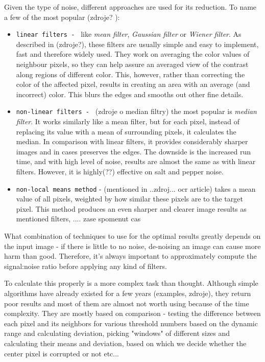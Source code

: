 Given the type of noise, different approaches are used for its reduction. To name a few of the most popular (zdroje? ):
\begin{itemize}

\item\texttt{linear filters - } like \emph{mean filter}, \emph{Gaussian filter} or \emph{Wiener filter}. As described in (zdroje?), these filters are usually simple and easy to implement, fast and therefore widely used. They work on averaging the color values of neighbour pixels, so they can help assure an averaged view of the contrast along regions of different color. This, however, rather than correcting the color of the affected pixel, results in creating an area with an average (and incorrect) color. This blurs the edges and smooths out other fine details.

\item\texttt{non-linear filters - } (zdroje o median filtry) the most popular is \emph{median filter}. It works similarly like a mean filter, but for each pixel, instead of replacing its value with a mean of surrounding pixels, it calculates the median. In comparison with linear filters, it provides considerably sharper images and in cases preserves the edges. The downside is the increased run time, and with high level of noise, results are almost the same as with linear filters. However, it is highly(??) effective on salt and pepper noise.

\item\texttt{non-local means method} - (mentioned in ..zdroj... ocr article) takes a mean value of all pixels, weighted by how similar these pixels are to the target pixel. This method produces an even sharper and clearer image results as mentioned filters, .... zase spomenut cas

\end{itemize}

What combination of techniques to use for the optimal results greatly depends on the input image - if there is little to no noise, de-noising an image can cause more harm than good. Therefore, it's always important to approximately compute the signal:noise ratio before applying any kind of filters.

To calculate this properly is a more complex task than thought. Although simple algorithms have already existed for a few years (examples, zdroje), they return poor results and most of them are almost not worth using because of the time complexity. They are mostly based on comparison - testing the difference between each pixel and its neighbors for various threshold numbers based on the dynamic range and calculating deviation, picking "windows" of different sizes and calculating their means and deviation, based on which we decide whether the center pixel is corrupted or not etc...

